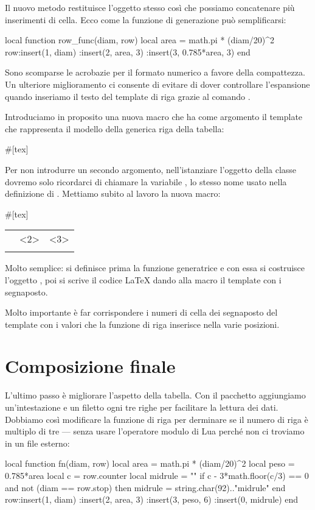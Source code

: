 Il nuovo metodo restituisce l'oggetto stesso così che possiamo concatenare più
inserimenti di cella. Ecco come la funzione di generazione può semplificarsi:
\begin{lines}
local function row_func(diam, row)
    local area = math.pi * (diam/20)^2
    row:insert(1, diam)
       :insert(2, area, 3)
       :insert(3, 0.785*area, 3)
end
\end{lines}

Sono scomparse le acrobazie per il formato numerico a favore della compattezza.
Un ulteriore miglioramento ci consente di evitare di dover controllare
l'espansione quando inseriamo il testo del template di riga grazie al comando
.

Introduciamo in proposito una nuova macro  che ha come argomento il
template che rappresenta il modello della generica riga della tabella:
\begin{lines}
#[tex]
\newcommand{\printrow}[1]{\directlua{
local tmpl = [=[\detokenize{#1}]=]
for _, s in row:iter_template(tmpl) do
   tex.print(s)
end
}}
\end{lines}

Per non introdurre un secondo argomento, nell'istanziare l'oggetto della classe
 dovremo solo ricordarci di chiamare la variabile , lo stesso
nome usato nella definizione di . Mettiamo subito al lavoro la
nuova macro:
\begin{lines}
#[tex]
\begin{tabular}{lrr}
\printrow{\textbf{<1>} & <2> & <3>\\}
\end{tabular}
\end{lines}

Molto semplice: si definisce prima la funzione generatrice e con essa si
costruisce l'oggetto , poi si scrive il codice \LaTeX{} dando alla
macro  il template con i segnaposto.

Molto importante è far corrispondere i numeri di cella dei segnaposto del
template con i valori che la funzione di riga inserisce nella varie posizioni.


\section{Composizione finale}

L'ultimo passo è migliorare l'aspetto della tabella. Con il pacchetto
 aggiungiamo un'intestazione e un filetto ogni tre righe per
facilitare la lettura dei dati. Dobbiamo così modificare la funzione di riga per
derminare se il numero di riga è multiplo di tre --- senza usare l'operatore
modulo \key{\%} di Lua perché non ci troviamo in un file esterno:
\begin{lines}
local function fn(diam, row)
    local area = math.pi * (diam/20)^2
    local peso = 0.785*area
    local c = row.counter
    local midrule = ""
    if c - 3*math.floor(c/3) == 0
    and not (diam == row.stop) then
        midrule = string.char(92).."midrule"
    end
    row:insert(1, diam)
       :insert(2, area, 3)
       :insert(3, peso, 6)
       :insert(0, midrule)
end
\end{lines}


